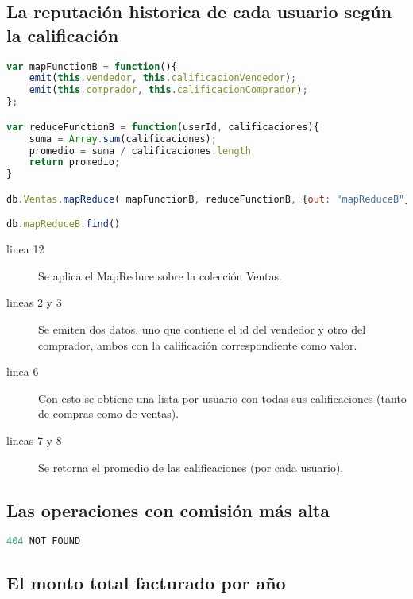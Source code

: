 \newpage
\subsection{La reputación historica de cada usuario según la calificación}

\begin{lstlisting}[language=JavaScript]
var mapFunctionB = function(){
	emit(this.vendedor, this.calificacionVendedor);
	emit(this.comprador, this.calificacionComprador);
};

var reduceFunctionB = function(userId, calificaciones){
	suma = Array.sum(calificaciones);
	promedio = suma / calificaciones.length
	return promedio;
}

db.Ventas.mapReduce( mapFunctionB, reduceFunctionB, {out: "mapReduceB"} )

db.mapReduceB.find()
\end{lstlisting}

\begin{description}
 \item[linea 12] Se aplica el MapReduce sobre la colección Ventas.
 \item[lineas 2 y 3] Se emiten dos datos, uno que contiene el id del vendedor y otro del comprador, ambos con la calificación correspondiente como valor.
 \item[linea 6] Con esto se obtiene una lista por usuario con todas sus calificaciones (tanto de compras como de ventas).
 \item[lineas 7 y 8] Se retorna el promedio de las calificaciones (por cada usuario).
\end{description}

\subsection{Las operaciones con comisión más alta}

\begin{lstlisting}[language=JavaScript]
404 NOT FOUND
\end{lstlisting}

\newpage
\subsection{El monto total facturado por año}

